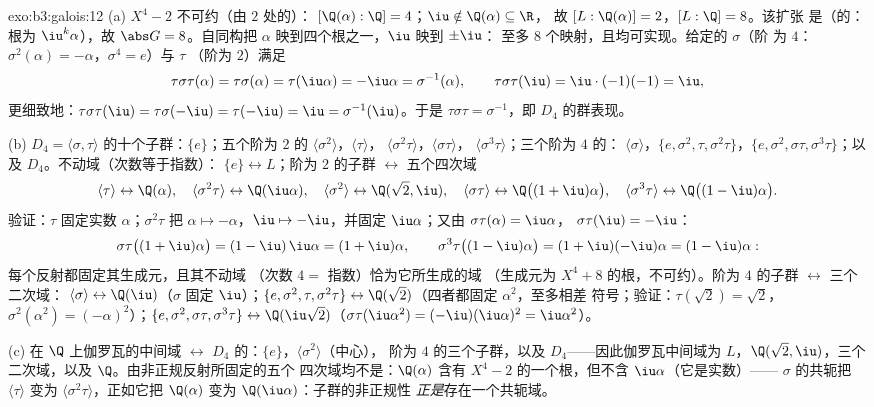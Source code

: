 \begin{solution}{exo:b3:galois:12}
(a) $X^4 - 2$ 不可约（由 $2$ 处的）：
$[\Q(\alpha):\Q] = 4$；$\iu \notin \Q(\alpha) \subseteq \R$，
故 $[L : \Q(\alpha)] = 2$，$[L:\Q] = 8$。该扩张
是（的：根为
$\iu^k\alpha$），故 $\abs G = 8$。自同构把
$\alpha$ 映到四个根之一，$\iu$ 映到 $\pm\iu$：
至多 $8$ 个映射，且均可实现。给定的 $\sigma$（阶
为 $4$：$\sigma^2(\alpha) = -\alpha$，$\sigma^4 = e$）与 $\tau$
（阶为 $2$）满足
\[
\tau\sigma\tau(\alpha) = \tau\sigma(\alpha) =
\tau(\iu\alpha) = -\iu\alpha = \sigma^{-1}(\alpha),
\qquad \tau\sigma\tau(\iu) = \iu\cdot(-1)(-1) = \iu ,
\]
更细致地：$\tau\sigma\tau(\iu) = \tau\sigma(-\iu) =
\tau(-\iu) = \iu = \sigma^{-1}(\iu)$。于是 $\tau\sigma\tau =
\sigma^{-1}$，即 $D_4$ 的群表现。

(b) $D_4 = \langle\sigma,
\tau\rangle$ 的十个子群：$\{e\}$；五个阶为 $2$ 的
$\langle\sigma^2\rangle$，$\langle\tau\rangle$，
$\langle\sigma^2\tau\rangle$，$\langle\sigma\tau\rangle$，
$\langle\sigma^3\tau\rangle$；三个阶为 $4$ 的：
$\langle\sigma\rangle$，$\{e, \sigma^2, \tau,
\sigma^2\tau\}$，$\{e, \sigma^2, \sigma\tau,
\sigma^3\tau\}$；以及 $D_4$。不动域（次数等于指数）：
$\{e\} \leftrightarrow L$；阶为 $2$ 的子群
$\leftrightarrow$ 五个四次域
\[
\langle\tau\rangle \leftrightarrow \Q(\alpha),\quad
\langle\sigma^2\tau\rangle \leftrightarrow \Q(\iu\alpha),
\quad
\langle\sigma^2\rangle \leftrightarrow \Q(\sqrt2, \iu),\quad
\langle\sigma\tau\rangle \leftrightarrow
\Q\bigl((1+\iu)\alpha\bigr),\quad
\langle\sigma^3\tau\rangle \leftrightarrow
\Q\bigl((1-\iu)\alpha\bigr) .
\]
验证：$\tau$ 固定实数 $\alpha$；$\sigma^2\tau$ 把
$\alpha \mapsto -\alpha$，$\iu \mapsto -\iu$，并固定
$\iu\alpha$；又由 $\sigma\tau(\alpha) = \iu\alpha$，
$\sigma\tau(\iu) = -\iu$：
\[
\sigma\tau\bigl((1+\iu)\alpha\bigr) =
(1 - \iu)\,\iu\alpha = (1 + \iu)\alpha,
\qquad
\sigma^3\tau\bigl((1-\iu)\alpha\bigr) =
(1 + \iu)(-\iu)\alpha = (1 - \iu)\alpha :
\]
每个反射都固定其生成元，且其不动域
（次数 $4 =$ 指数）恰为它所生成的域
（生成元为 $X^4 + 8$ 的根，不可约）。阶为 $4$ 的子群
$\leftrightarrow$ 三个二次域：
$\langle\sigma\rangle \leftrightarrow \Q(\iu)$（$\sigma$
固定 $\iu$）；$\{e, \sigma^2, \tau, \sigma^2\tau\}
\leftrightarrow \Q(\sqrt2)$（四者都固定 $\alpha^2$，至多相差
符号；验证：$\tau(\sqrt2) = \sqrt2$，$\sigma^2(\alpha^2) =
(-\alpha)^2$）；$\{e, \sigma^2, \sigma\tau, \sigma^3\tau\}
\leftrightarrow \Q(\iu\sqrt2)$（$\sigma\tau(\iu\alpha^2) =
(-\iu)(\iu\alpha)^2 = \iu\alpha^2$）。

(c) 在 $\Q$ 上伽罗瓦的中间域 $\leftrightarrow$
$D_4$ 的：$\{e\}$，$\langle\sigma^2\rangle$（中心），
阶为 $4$ 的三个子群，以及 $D_4$——因此伽罗瓦中间域为
$L$，$\Q(\sqrt2, \iu)$，三个
二次域，以及 $\Q$。由非正规反射所固定的五个
四次域均不是：$\Q(\alpha)$ 含有
$X^4 - 2$ 的一个根，但不含 $\iu\alpha$（它是实数）——
$\sigma$ 的共轭把 $\langle\tau\rangle$ 变为
$\langle\sigma^2\tau\rangle$，正如它把
$\Q(\alpha)$ 变为 $\Q(\iu\alpha)$：子群的非正规性
\emph{正是}存在一个共轭域。
\end{solution}

